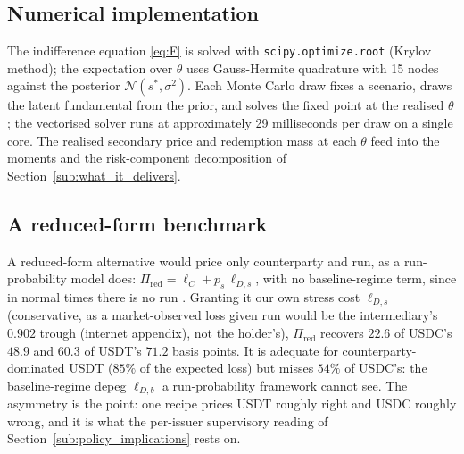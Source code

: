\subsection{Numerical implementation}\label{app:numerical}

The indifference equation \eqref{eq:F} is solved with \texttt{scipy.optimize.root} (Krylov method); the expectation over $\theta$ uses Gauss-Hermite quadrature with 15 nodes against the posterior $\mathcal{N}(s^*, \sigma^2)$. Each Monte Carlo draw fixes a scenario, draws the latent fundamental from the prior, and solves the fixed point at the realised $\theta$; the vectorised solver runs at approximately 29 milliseconds per draw on a single core. The realised secondary price and redemption mass at each $\theta$ feed into the moments and the risk-component decomposition of Section~\ref{sub:what_it_delivers}.

\subsection{A reduced-form benchmark}\label{app:decomposition}

A reduced-form alternative would price only counterparty and run, as a run-probability model does: $\Pi_{\text{red}} = \ell_C + p_s\,\ell_{D,s}$, with no baseline-regime term, since in normal times there is no run \citep{klee_etal_2026_fragility}. Granting it our own stress cost $\ell_{D,s}$ (conservative, as a market-observed loss given run would be the intermediary's $0.902$ trough (internet appendix), not the holder's), $\Pi_{\text{red}}$ recovers $22.6$ of USDC's $48.9$ and $60.3$ of USDT's $71.2$ basis points. It is adequate for counterparty-dominated USDT ($85\%$ of the expected loss) but misses $54\%$ of USDC's: the baseline-regime depeg $\ell_{D,b}$ a run-probability framework cannot see. The asymmetry is the point: one recipe prices USDT roughly right and USDC roughly wrong, and it is what the per-issuer supervisory reading of Section~\ref{sub:policy_implications} rests on.
